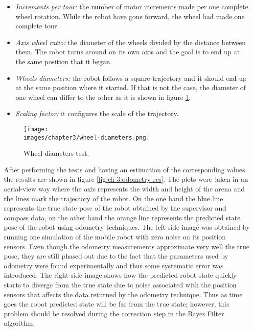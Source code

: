 \begin{itemize}
\item \textit{Increments per tour: } the number of motor increments made per one complete wheel rotation. While the robot have gone forward, the wheel had made one complete tour. 
\item \textit{Axis wheel ratio: } the diameter of the wheels divided by the distance between them. The robot turns around on its own axis and the goal is to end up at the same position that it began.
\item \textit{Wheels diameters: } the robot follows a square trajectory and it should end up at the same position where it started. If that is not the case, the diameter of one wheel can differ to the other as it is shown in figure \ref{fig:ch-3:wheel-diameters}.
\item \textit{Scaling factor: } it configures the scale of the trajectory.
\end{itemize}

\begin{figure}[h!]
  \centering
  \texttt{[image: \\images/chapter3/wheel-diameters.png]}
  \caption{Wheel diameters test.}
  \label{fig:ch-3:wheel-diameters}
\end{figure}

After performing the tests and having an estimation of the corresponding values the results are shown in figure \ref{fig:ch-3:odometry-res}. The plots were taken in an aerial-view way where the axis represents the width and height of the arena and the lines mark the trajectory of the robot. On the one hand the blue line represents the true state pose of the robot obtained by the supervisor and compass data, on the other hand the orange line represents the predicted state pose of the robot using odometry techniques. The left-side image was obtained by running one simulation of the mobile robot with zero noise on its position sensors. Even though the odometry measurements approximate very well the true pose, they are still phased out due to the fact that the parameters used by odometry were found experimentally and thus some systematic error was introduced. The right-side image shows how the predicted robot state quickly starts to diverge from the true state due to noise associated with the position sensors that affects the data returned by the odometry technique. Thus as time goes the robot predicted state will be far from the true state; however, this problem should be resolved during the correction step in the Bayes Filter algorithm.

